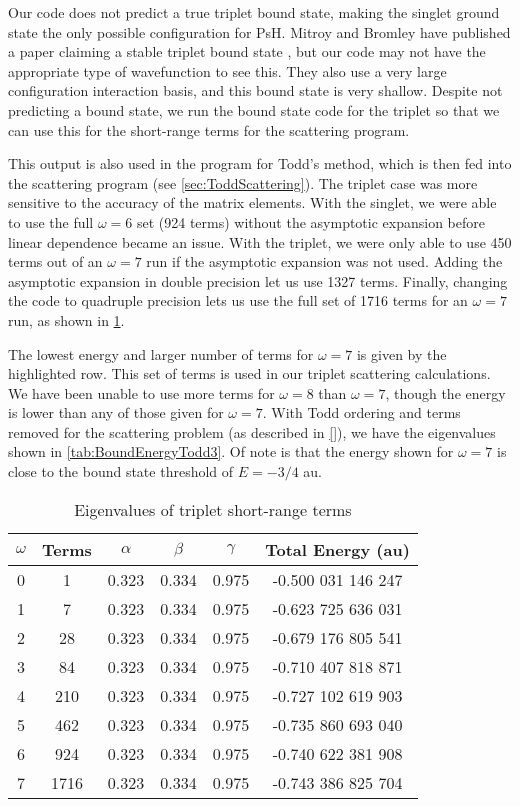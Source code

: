 \documentclass[Dissertation.tex]{subfiles}
\begin{document}
Our code does not predict a true triplet bound state, making the singlet ground state the only possible configuration for PsH. Mitroy and Bromley have published a paper claiming a stable triplet bound state \cite{Mitroy2007}, but our code may not have the appropriate type of wavefunction to see this. They also use a very large configuration interaction basis, and this bound state is very shallow. Despite not predicting a bound state, we run the bound state code for the triplet so that we can use this for the short-range terms for the scattering program.

This output is also used in the program for Todd's method, which is then fed into the scattering program (see \cref{sec:ToddScattering}). The triplet case was more sensitive to the accuracy of the matrix elements. With the singlet, we were able to use the full $\omega = 6$ set (924 terms) without the asymptotic expansion before linear dependence became an issue. With the triplet, we were only able to use 450 terms out of an $\omega = 7$ run if the asymptotic expansion was not used. Adding the asymptotic expansion in double precision let us use 1327 terms. Finally, changing the code to quadruple precision lets us use the full set of 1716 terms for an $\omega = 7$ run, as shown in \cref{tab:BoundEnergy3}. 
 
The lowest energy and larger number of terms for $\omega = 7$ is given by the highlighted row.  This set of terms is used in our triplet scattering calculations.  We have been unable to use more terms for $\omega = 8$ than $\omega = 7$, though the energy is lower than any of those given for $\omega = 7$. With Todd ordering and terms removed for the scattering problem (as described in \cref{}), we have the eigenvalues shown in \cref{tab:BoundEnergyTodd3}. Of note is that the energy shown for $\omega = 7$ is close to the bound state threshold of $E = -3/4$ au.

\setlength{\abovecaptionskip}{6pt}   %
\setlength{\belowcaptionskip}{6pt}   %
\begin{table}[H]
\centering
\begin{tabular}{c c c c c c}
\toprule
$\omega$ & Terms & $\alpha$ & $\beta$ & $\gamma$ & Total Energy (au) \\ [0.5ex]
\midrule
0 & 1 & 0.323 & 0.334 & 0.975 & -0.500 031 146 247 \\
1 & 7 & 0.323 & 0.334 & 0.975 & -0.623 725 636 031 \\
2 & 28 & 0.323 & 0.334 & 0.975 & -0.679 176 805 541 \\
3 & 84 & 0.323 & 0.334 & 0.975 & -0.710 407 818 871 \\
4 & 210 & 0.323 & 0.334 & 0.975 & -0.727 102 619 903 \\
5 & 462 & 0.323 & 0.334 & 0.975 & -0.735 860 693 040 \\
6 & 924 & 0.323 & 0.334 & 0.975 & -0.740 622 381 908 \\
7 & 1716 & 0.323 & 0.334 & 0.975 & -0.743 386 825 704 \\
\bottomrule
\end{tabular}
\caption{Eigenvalues of triplet short-range terms} %
\label{tab:BoundEnergy3}
\end{table}
\end{document}
